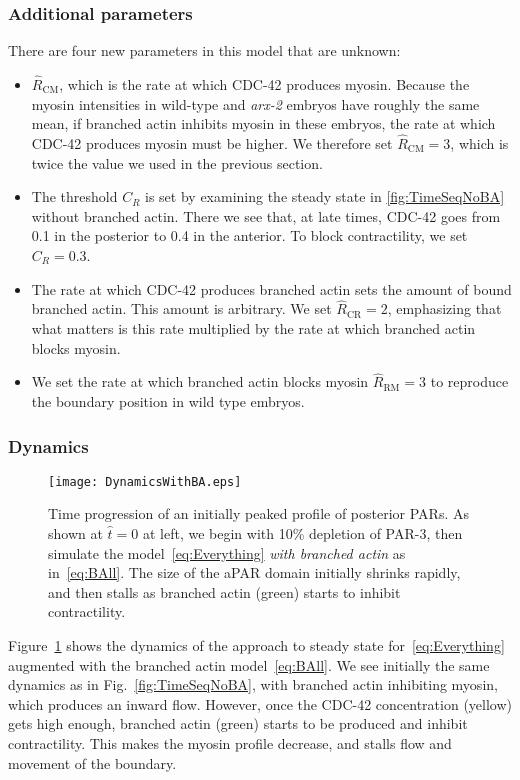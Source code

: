 \documentclass[11pt]{article}
\newcommand{\red}[1]{\color{red}#1\normalcolor}
\newcommand{\6}[1]{#1_{\text{6}}}
\newcommand{\3}[1]{#1_{\text{3}}}
\begin{document}
\subsubsection{Additional parameters}
There are four new parameters in this model that are unknown: 
\begin{itemize}
\item \red{$\hat{R}_\text{CM}$, which is the rate at which CDC-42 produces myosin. Because the myosin intensities in wild-type and \emph{arx-2} embryos have roughly the same mean, if branched actin inhibits myosin in these embryos, the rate at which CDC-42 produces myosin must be higher. We therefore set $\hat{R}_\text{CM}=3$, which is twice the value we used in the previous section.}
\item The threshold $C_R$ is set by examining the steady state in \ref{fig:TimeSeqNoBA} without branched actin. There we see that, at late times, CDC-42 goes from 0.1 in the posterior to 0.4 in the anterior. To block contractility, we set $C_R=0.3$. 
\item The rate at which CDC-42 produces branched actin sets the amount of bound branched actin. This amount is arbitrary. We set $\hat R_\text{CR}=2$, emphasizing that what matters is this rate multiplied by the rate at which branched actin blocks myosin. 
\item We set the rate at which branched actin blocks myosin $\hat R_\text{RM}=3$ to reproduce the boundary position in wild type embryos. 
\end{itemize}

\subsubsection{Dynamics}
\begin{figure}
\centering
\texttt{[image: DynamicsWithBA.eps]}
\caption{\label{fig:TimeSeqBA} Time progression of an initially peaked profile of posterior PARs. As shown at $\hat t=0$ at left, we begin with 10\% depletion of PAR-3, then simulate the model\ \eqref{eq:Everything} \emph{with branched actin} as in\ \eqref{eq:BAll}. The size of the aPAR domain initially shrinks rapidly, and then stalls as branched actin (green) starts to inhibit contractility.}
\end{figure}

Figure\ \ref{fig:TimeSeqBA} shows the dynamics of the approach to steady state for\ \eqref{eq:Everything} augmented with the branched actin model\ \eqref{eq:BAll}. We see initially the same dynamics as in Fig.\ \ref{fig:TimeSeqNoBA}, with branched actin inhibiting myosin, which produces an inward flow. However, once the CDC-42 concentration (yellow) gets high enough, branched actin (green) starts to be produced and inhibit contractility. This makes the myosin profile decrease, and stalls flow and movement of the boundary. 
\end{document}
